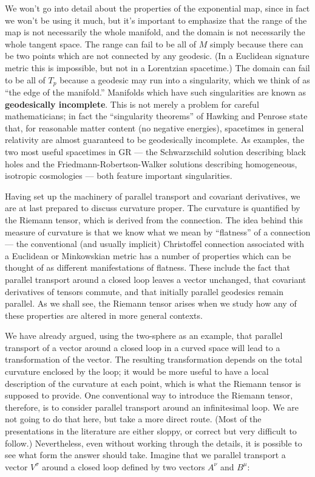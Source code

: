 We won't go into detail about the properties of the exponential map,
since in fact we won't be using it much, but it's important to emphasize
that the range of the map is not necessarily the whole manifold, and the
domain is not necessarily the whole tangent space.  The range can fail
to be all of $M$ simply because there can be two points which are not
connected by any geodesic.  (In a Euclidean signature metric this is 
impossible, but not in a Lorentzian spacetime.)  The domain can fail
to be all of $T_p$ because a geodesic may run into a singularity, which
we think of as ``the edge of the manifold.''  Manifolds which have
such singularities are known as {\bf geodesically incomplete}.  This
is not merely a problem for careful mathematicians; in fact the
``singularity theorems'' of Hawking and Penrose state that, for
reasonable matter content (no negative energies), spacetimes in
general relativity are almost guaranteed to be geodesically incomplete.
As examples, the two most useful spacetimes in GR --- the Schwarzschild
solution describing black holes and the Friedmann-Robertson-Walker
solutions describing homogeneous, isotropic cosmologies --- both feature
important singularities.

Having set up the machinery of parallel transport and covariant
derivatives, we are at last prepared to discuss curvature proper.
The curvature is quantified by the Riemann tensor, which is derived
from the connection.  The idea behind this measure of curvature
is that we know what we mean by ``flatness'' of a connection ---
the conventional (and usually implicit) Christoffel connection
associated with a Euclidean or Minkowskian metric has a number of
properties which can be thought of as different manifestations 
of flatness.  These include the fact that parallel transport around
a closed loop leaves a vector unchanged, that covariant derivatives
of tensors commute, and that initially parallel geodesics remain
parallel.  As we shall see, the Riemann tensor arises when we 
study how any of these properties are altered in more general
contexts.

We have already argued, using the two-sphere as an example, that parallel
transport of a vector around a closed loop in a curved space will lead 
to a transformation of the vector.  The resulting transformation 
depends on the total curvature enclosed by the loop; it would be more
useful to have a local description of the curvature at each point,
which is what the Riemann tensor is supposed to provide.
One conventional way to introduce the Riemann tensor, therefore,
is to consider parallel transport around an 
infinitesimal loop.  We are not going to do that here, but take a 
more direct route.  (Most of the presentations in the literature are
either sloppy, or correct but very difficult to follow.)  Nevertheless,
even without working through the details, it is possible to see what
form the answer should take.  Imagine that we parallel transport a
vector $V^\sigma$ around a closed loop defined by two vectors $A^\nu$ and 
$B^\mu$:


